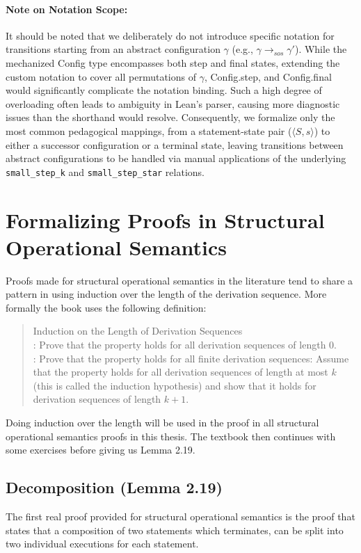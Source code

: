 \paragraph{Note on Notation Scope:}
It should be noted that we deliberately do not introduce specific notation for
transitions starting from an abstract configuration
$\gamma$ (e.g., $\gamma \to_{sos} \gamma'$). While the mechanized Config type encompasses
both step and final states, extending the custom notation to cover all permutations
of $\gamma$, Config.step, and Config.final would significantly complicate the
notation binding. Such a high degree of overloading often leads to ambiguity
in Lean's parser, causing more diagnostic issues than the shorthand would resolve.
Consequently, we formalize only the most common pedagogical mappings, from a
statement-state pair ($\langle S, s \rangle$) to either a successor configuration
or a terminal state, leaving transitions between abstract configurations to be
handled via manual applications of the underlying \texttt{small\_step\_k} and
\texttt{small\_step\_star} relations.


%
%
%
\section{Formalizing Proofs in Structural Operational Semantics}
Proofs made for structural operational semantics in the literature tend to share a pattern in using induction over the length of the derivation sequence.
More formally the book uses the following definition:
\begin{quotation}
\noindent
Induction on the Length of Derivation Sequences\vspace{1em} \\  : Prove that the property holds for all derivation sequences of length 0. \vspace{1em} \\ : Prove that the property holds for all finite derivation sequences:
Assume that the property holds for all derivation sequences of length at
most \(k\) (this is called the induction hypothesis) and show that it holds
for derivation sequences of length \(k+1\).
\end{quotation}
Doing induction over the length will be used in the proof in all structural operational semantics proofs in this thesis.
The textbook then continues with some exercises before giving us Lemma 2.19.

%
%
\subsection{Decomposition (Lemma 2.19)}
\label{formal_ns_sos_equiv:sos:comp_split}
The first real proof provided for structural operational semantics is the proof that states
that a composition of two statements which terminates, can be split into two individual executions for each statement.

